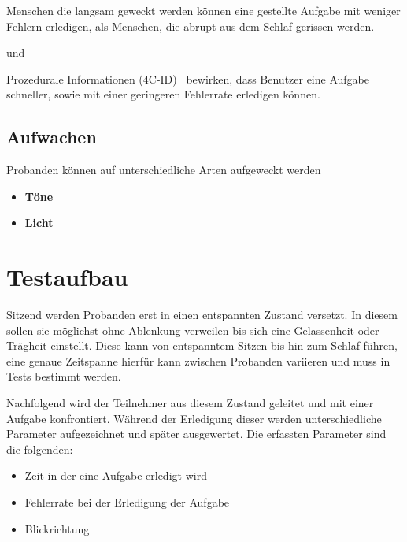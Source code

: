 \begin{hyp}\label{hyp:erfolgreicher}
	Menschen die langsam geweckt werden können eine gestellte Aufgabe mit weniger Fehlern erledigen, als Menschen, die abrupt aus dem Schlaf gerissen werden.
\end{hyp}

und

\begin{hyp}\label{hyp:gestaltung}
	Prozedurale Informationen (4C-ID)~\cite{van2002blueprints} bewirken, dass Benutzer eine Aufgabe schneller, sowie mit einer geringeren Fehlerrate erledigen können.
\end{hyp}

\subsection{Aufwachen}
Probanden können auf unterschiedliche Arten aufgeweckt werden~\cite{jewett1999time, ferrara2000sleep}
\begin{itemize}
	\item \textbf{Töne}
	\item \textbf{Licht}
\end{itemize}

\section{Testaufbau}
Sitzend werden Probanden erst in einen entspannten Zustand versetzt. In diesem sollen sie möglichst ohne Ablenkung verweilen bis sich eine Gelassenheit oder Trägheit einstellt. Diese kann von entspanntem Sitzen bis hin zum Schlaf führen, eine genaue Zeitspanne hierfür kann zwischen Probanden variieren und muss in Tests bestimmt werden.

Nachfolgend wird der Teilnehmer aus diesem Zustand geleitet und mit einer Aufgabe konfrontiert. Während der Erledigung dieser werden unterschiedliche Parameter aufgezeichnet und später ausgewertet. Die erfassten Parameter sind die folgenden:

\begin{itemize}
	\item Zeit in der eine Aufgabe erledigt wird
	\item Fehlerrate bei der Erledigung der Aufgabe
	\item Blickrichtung
\end{itemize}

